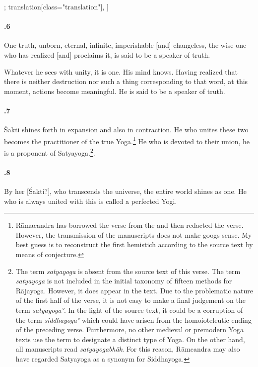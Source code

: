 \begin{alignment}[
  texts=edition[class="edition"];
  translation[class="translation"],
  ]
\begin{translation}
\begin{tlate}[44_6]
      \paragraph{.6} One truth, unborn, eternal, infinite, imperishable [and] changeless, the wise one who has realized [and] proclaims it, is said to be a speaker of truth. \\
    \end{tlate}
    \begin{tlate}[p44_03]
      Whatever he sees with unity, it is one. His mind knows. Having realized that there is neither destruction nor such a thing corresponding to that word, at this moment, actions become meaningful. He is said to be a speaker of truth.
    \end{tlate}
    \begin{tlate}[44_7]
      \paragraph{.7} Śakti shines forth in expansion and also in contraction. He who unites these two becomes the practitioner of the true Yoga.\footnote{Rāmacandra has borrowed the verse from the  and then redacted the verse. However, the transmission of the manuscripts does not make googs sense. My best guess is to reconstruct the first hemistich according to the source text by means of conjecture.}
      He who is devoted to their union, he is a proponent of Satyayoga.\footnote{The term \textit{satyayoga} is absent from the source text of this verse. The term \textit{satyayoga} is not included in the initial taxonomy of fifteen methods for Rājayoga. However, it does appear in the text. Due to the problematic nature of the first half of the verse, it is not easy to make a final judgement on the term \textit{satyayoga°}. In the light of the source text, it could be a corruption of the term \textit{siddhayoga°} which could have arisen from the homoioteleutic ending of the preceding verse. Furthermore, no other medieval or premodern Yoga texts use the term to designate a distinct type of Yoga. On the other hand, all manuscripts read \textit{satyayogabhāk}. For this reason, Rāmcandra may also have regarded Satyayoga as a synonym for Siddhayoga.\label{satyayoganote}}.
    \end{tlate}
    \begin{tlate}[44_8]
      \paragraph{.8} By her [Śakti?], who transcends the universe, the entire world shines as one. He who is always united with this is called a perfected Yogi.
    \end{tlate}
    \begin{tlate}[44_9]

\end{tlate}
\end{translation}
\end{alignment}
